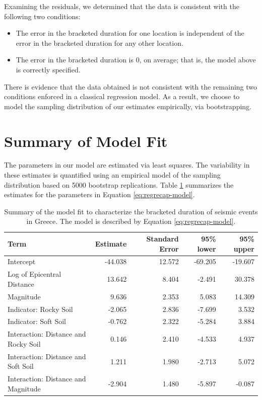 \documentclass[
]{book}
\providecommand{\tightlist}{%
  \setlength{\itemsep}{0pt}\setlength{\parskip}{0pt}}
\theoremstyle{plain}
\theoremstyle{mydefn}
\theoremstyle{myexmpl}
\theoremstyle{remark}
\begin{document}
Examining the residuals, we determined that the data is consistent with the following two conditions:

\begin{itemize}
\tightlist
\item
  The error in the bracketed duration for one location is independent of the error in the bracketed duration for any other location.
\item
  The error in the bracketed duration is 0, on average; that is, the model above is correctly specified.
\end{itemize}

There is evidence that the data obtained is not consistent with the remaining two conditions enforced in a classical regression model. As a result, we choose to model the sampling distribution of our estimates empirically, via bootstrapping.

\hypertarget{summary-of-model-fit}{%
\section{Summary of Model Fit}\label{summary-of-model-fit}}

The parameters in our model are estimated via least squares. The variability in these estimates is quantified using an empirical model of the sampling distribution based on 5000 bootstrap replications. Table \ref{tab:regrecap-model-fit} summarizes the estimates for the parameters in Equation \eqref{eq:regrecap-model}.



\begin{table}

\caption{\label{tab:regrecap-model-fit}Summary of the model fit to characterize the bracketed duration of seismic events in Greece. The model is described by Equation \eqref{eq:regrecap-model}.}
\centering
\begin{tabular}[t]{l|r|r|r|r}
\hline
Term & Estimate & Standard Error & 95\% lower & 95\% upper\\
\hline
Intercept & -44.038 & 12.572 & -69.205 & -19.607\\
\hline
Log of Epicentral Distance & 13.642 & 8.404 & -2.491 & 30.378\\
\hline
Magnitude & 9.636 & 2.353 & 5.083 & 14.309\\
\hline
Indicator: Rocky Soil & -2.065 & 2.836 & -7.699 & 3.532\\
\hline
Indicator: Soft Soil & -0.762 & 2.322 & -5.284 & 3.884\\
\hline
Interaction: Distance and Rocky Soil & 0.146 & 2.410 & -4.533 & 4.937\\
\hline
Interaction: Distance and Soft Soil & 1.211 & 1.980 & -2.713 & 5.072\\
\hline
Interaction: Distance and Magnitude & -2.904 & 1.480 & -5.897 & -0.087\\
\hline
\end{tabular}
\end{table}
\end{document}
